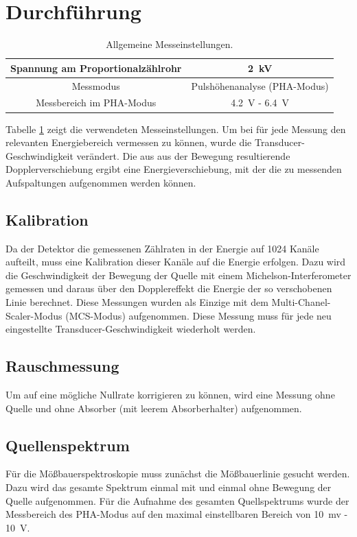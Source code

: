 \documentclass[12pt,a4paper]{article}
\begin{document}
\section{Durchführung}

\begin{table}
\centering
\begin{tabular}{|c|c|}
\hline 
Spannung am Proportionalzählrohr & \SI{2}{kV} \\ 
\hline 
Messmodus & Pulshöhenanalyse (PHA-Modus) \\
\hline 
Messbereich im PHA-Modus & \SI{4,2}{V} - \SI{6,4}{V} \\
\hline 
\end{tabular} 
\caption{Allgemeine Messeinstellungen.}
\label{tab:Mess_Einstellungen}
\end{table}

Tabelle \ref{tab:Mess_Einstellungen} zeigt die verwendeten Messeinstellungen. Um bei für jede Messung den relevanten Energiebereich vermessen zu können, wurde die Transducer-Geschwindigkeit verändert. Die aus aus der Bewegung resultierende Dopplerverschiebung  ergibt eine Energieverschiebung, mit der die zu messenden Aufspaltungen aufgenommen werden können.

\subsection{Kalibration}
Da der Detektor die gemessenen Zählraten in der Energie auf 1024 Kanäle aufteilt, muss eine Kalibration dieser Kanäle auf die Energie erfolgen. Dazu wird die Geschwindigkeit der Bewegung der Quelle mit einem Michelson-Interferometer gemessen und daraus über den Dopplereffekt die Energie der so verschobenen Linie berechnet. Diese Messungen wurden als Einzige mit dem Multi-Chanel-Scaler-Modus (MCS-Modus) aufgenommen. Diese Messung muss für jede neu eingestellte Transducer-Geschwindigkeit wiederholt werden.

\subsection{Rauschmessung}
Um auf eine mögliche Nullrate korrigieren zu können, wird eine Messung ohne Quelle und ohne Absorber (mit leerem Absorberhalter) aufgenommen.

\subsection{Quellenspektrum}
Für die Mößbauerspektroskopie muss zunächst die Mößbauerlinie gesucht werden. Dazu wird das gesamte Spektrum einmal mit und einmal ohne Bewegung der Quelle aufgenommen. Für die Aufnahme des gesamten Quellspektrums wurde der Messbereich des PHA-Modus auf den maximal einstellbaren Bereich von \SI{10}{mv} - \SI{10}{V}.
\end{document}
